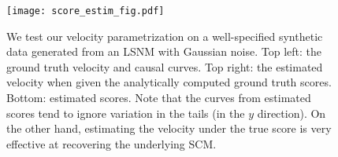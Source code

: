 \begin{figure}
    \centering
    \texttt{[image: score\_estim\_fig.pdf]}
    \vspace{-20pt}
    \caption{We test our velocity parametrization on a well-specified synthetic data generated from an LSNM with Gaussian noise. Top left: the ground truth velocity and causal curves. Top right: the estimated velocity when given the analytically computed ground truth scores. Bottom: estimated scores. Note that the curves from estimated scores tend to ignore variation in the tails (in the $y$ direction). On the other hand, estimating the velocity under the true score is very effective at recovering the underlying SCM.}
    \label{fig:score}
    \vspace{-5pt}
\end{figure}
